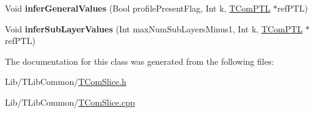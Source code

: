 {\bf }\par
\begin{DoxyCompactItemize}
\item 
\mbox{\label{class_t_com_p_t_l_afef4560dd422a66f3011524d921069ab}} 
Void {\bfseries infer\+General\+Values} (Bool profile\+Present\+Flag, Int k, \hyperlink{class_t_com_p_t_l}{T\+Com\+P\+TL} $\ast$ref\+P\+TL)
\item 
\mbox{\label{class_t_com_p_t_l_ab2cef8897d19f8f4e878d37248f17954}} 
Void {\bfseries infer\+Sub\+Layer\+Values} (Int max\+Num\+Sub\+Layers\+Minus1, Int k, \hyperlink{class_t_com_p_t_l}{T\+Com\+P\+TL} $\ast$ref\+P\+TL)
\end{DoxyCompactItemize}



The documentation for this class was generated from the following files\+:\begin{DoxyCompactItemize}
\item 
Lib/\+T\+Lib\+Common/\hyperlink{_t_com_slice_8h}{T\+Com\+Slice.\+h}\item 
Lib/\+T\+Lib\+Common/\hyperlink{_t_com_slice_8cpp}{T\+Com\+Slice.\+cpp}\end{DoxyCompactItemize}
